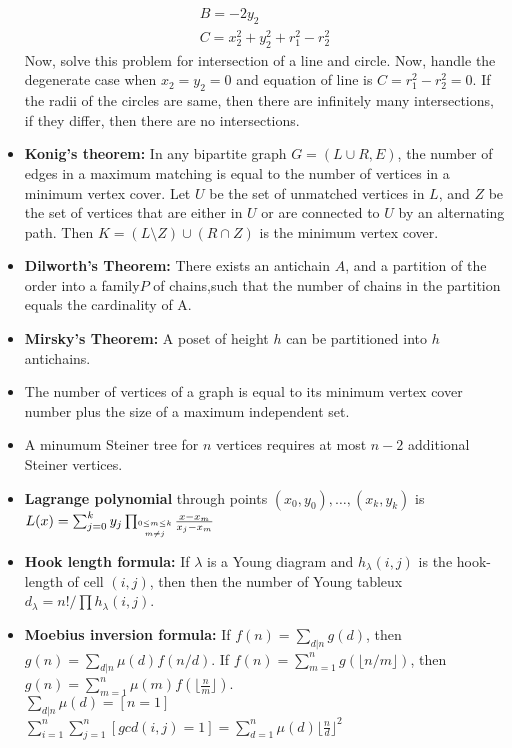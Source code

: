 \documentclass[15pt,a4paper]{article}
\begin{document}
\begin{landscape}
\begin{multicols*}{3}
\begin{itemize}
\begin{gather*}
            B = -2y_2\\
            C = x_2^2 + y_2^2 + r_1^2 - r_2^2
        \end{gather*}
    Now, solve this problem for intersection of a line and circle.
    Now, handle the degenerate case when $x_2 = y_2 = 0$ and equation of line is $C = r_1^2 - r_2^2 = 0$. If the radii of the circles are same, then there are infinitely many intersections, if they differ, then there are no intersections.
    \item \textbf{Konig's theorem:} In any bipartite graph $G=(L\cup R,E)$, the number
    of edges in a maximum matching is equal to the number of
    vertices in a minimum vertex cover. Let $U$ be the set of
    unmatched vertices in $L$, and $Z$ be the set of vertices that
    are either in $U$ or are connected to $U$ by an alternating
    path. Then $K=(L\setminus Z)\cup(R\cap Z)$ is the minimum
    vertex cover.
    \item \textbf{Dilworth's Theorem:} There exists an antichain $A$,
    and a partition of the order into a family$P$ of chains,such that the number
    of chains in the partition equals the cardinality of A.
    \item \textbf{Mirsky's Theorem:} A poset of height $h$ can be partitioned into $h$ antichains.
    \item The number of vertices of a graph is equal to its minimum
    vertex cover number plus the size of a maximum independent set.
    \item A minumum Steiner tree for $n$ vertices requires at most $n-2$ additional Steiner vertices.
    \item \textbf{Lagrange polynomial} through points $(x_0,y_0),\ldots,(x_k,y_k)$ is $L(x) = \sum_{j=0}^k y_j \prod_{\shortstack{$\scriptscriptstyle 0\leq m \leq k$ \\ $\scriptscriptstyle m\neq j$}} \frac{x-x_m}{x_j - x_m}$
    \item \textbf{Hook length formula:} If $\lambda$ is a Young diagram and $h_{\lambda}(i,j)$ is the hook-length of cell $(i,j)$, then then the number of Young tableux $d_{\lambda} = n!/\prod h_{\lambda}(i,j)$.
    \item \textbf{Moebius inversion formula:} If $f(n) = \sum_{d|n} g(d)$, then $g(n) = \sum_{d|n} \mu(d) f(n/d)$. If $f(n) = \sum_{m=1}^n g(\lfloor n/m\rfloor)$, then $g(n) = \sum_{m=1}^n \mu(m)f(\lfloor\frac{n}{m}\rfloor)$.
    \\$\sum_{d|n} \mu(d) = [n=1]$
    \\$\sum_{i=1}^n\sum_{j=1}^n[gcd(i,j)=1]= \sum_{d=1}^n\mu(d)\lfloor\frac{n}{d}\rfloor^2$

\end{itemize}
\end{multicols*}
\end{landscape}
\end{document}
